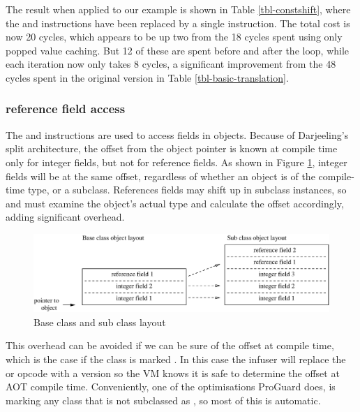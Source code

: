 The result when applied to our example is shown in Table \ref{tbl-constshift}, where the  and  instructions have been replaced by a single  instruction. The total cost is now 20 cycles, which appears to be up two from the 18 cycles spent using only popped value caching. But 12 of these are spent before and after the loop, while each iteration now only takes 8 cycles, a significant improvement from the 48 cycles spent in the original version in Table \ref{tbl-basic-translation}.


\subsubsection{ reference field access}
The  and  instructions are used to access fields in objects. Because of Darjeeling's split architecture, the offset from the object pointer is known at compile time only for integer fields, but not for reference fields. As shown in Figure \ref{fig-super-class-sub-class-field-layout}, integer fields will be at the same offset, regardless of whether an object is of the compile-time type, or a subclass. References fields may shift up in subclass instances, so  and  must examine the object's actual type and calculate the offset accordingly, adding significant overhead.

\begin{figure}[]
  \includegraphics[width=0.6\linewidth]{super-class-sub-class-field-layout.eps}
  \caption{Base class and sub class layout }
  \label{fig-super-class-sub-class-field-layout}
\end{figure}

This overhead can be avoided if we can be sure of the offset at compile time, which is the case if the class is marked . In this case the infuser will replace the  or  opcode with a  version so the VM knows it is safe to determine the offset at AOT compile time. Conveniently, one of the optimisations ProGuard does, is marking any class that is not subclassed as , so most of this is automatic.


